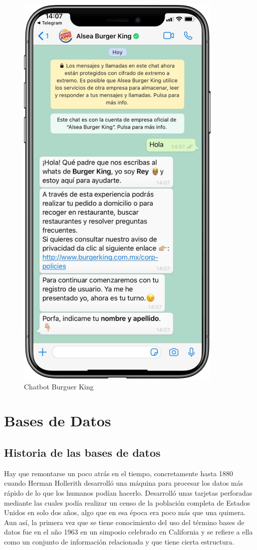 \begin{figure}[H]
    \centering
    \includegraphics[scale=0.4]{include/figuras/BurguerKing.png}
    \caption{Chatbot Burguer King}
    \label{fig:burguer}
\end{figure}


\section{Bases de Datos}
\subsection{Historia de las bases de datos}

Hay que remontarse un poco atrás en el tiempo, concretamente hasta 1880 cuando Herman Hollerith desarrolló una máquina para procesar los datos más rápido de lo que los humanos podían hacerlo. Desarrolló unas tarjetas perforadas mediante las cuales podía realizar un censo de la población completa de Estados Unidos en solo dos años, algo que en esa época era poco más que una quimera. Aun así, la primera vez que se tiene conocimiento del uso del término bases de datos fue en el año 1963 en un simposio celebrado en California y se refiere a ella como un conjunto de información relacionada y que tiene cierta estructura.

